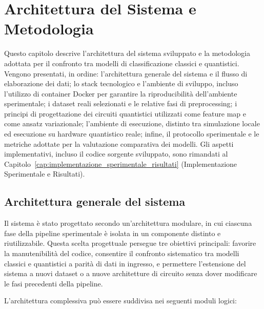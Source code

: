 \chapter{Architettura del Sistema e Metodologia}
\label{cap:architettura_sistema_metodologia}

Questo capitolo descrive l'architettura del sistema sviluppato e la metodologia adottata per il confronto tra modelli di classificazione classici e quantistici. Vengono presentati, in ordine: l'architettura generale del sistema e il flusso di elaborazione dei dati; lo stack tecnologico e l'ambiente di sviluppo, incluso l'utilizzo di container Docker per garantire la riproducibilità dell'ambiente sperimentale; i dataset reali selezionati e le relative fasi di preprocessing; i principi di progettazione dei circuiti quantistici utilizzati come feature map e come ansatz variazionale; l'ambiente di esecuzione, distinto tra simulazione locale ed esecuzione su hardware quantistico reale; infine, il protocollo sperimentale e le metriche adottate per la valutazione comparativa dei modelli. Gli aspetti implementativi, incluso il codice sorgente sviluppato, sono rimandati al Capitolo~\ref{cap:implementazione_sperimentale_risultati} (Implementazione Sperimentale e Risultati).

\section{Architettura generale del sistema}
\label{sec:architettura_generale}

Il sistema è stato progettato secondo un'architettura modulare, in cui ciascuna fase della pipeline sperimentale è isolata in un componente distinto e riutilizzabile. Questa scelta progettuale persegue tre obiettivi principali: favorire la manutenibilità del codice, consentire il confronto sistematico tra modelli classici e quantistici a parità di dati in ingresso, e permettere l'estensione del sistema a nuovi dataset o a nuove architetture di circuito senza dover modificare le fasi precedenti della pipeline.

L'architettura complessiva può essere suddivisa nei seguenti moduli logici:


